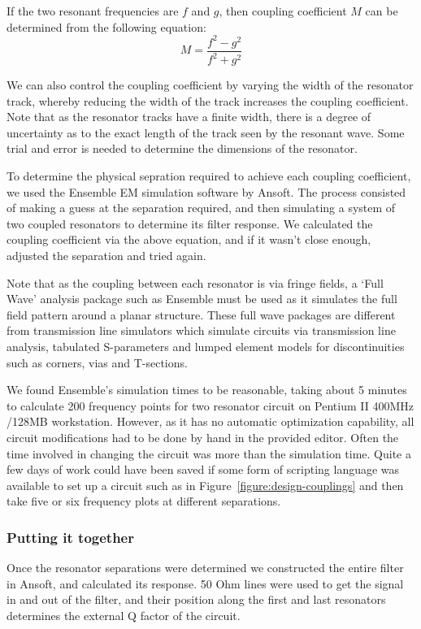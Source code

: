 If the two resonant frequencies are $f$ and $g$, then coupling coefficient $M$ can be determined from the following equation:
$$
M = 	\frac	{f^2 - g^2}
		{f^2 + g^2}
$$

We can also control the coupling coefficient by varying the width of the resonator track, whereby reducing the width of the track increases the coupling coefficient. Note that as the resonator tracks have a finite width, there is a degree of uncertainty as to the exact length of the track seen by the resonant wave. Some trial and error is needed to determine the dimensions of the resonator. 

To determine the physical sepration required to achieve each coupling coefficient, we used the Ensemble EM simulation software by Ansoft. The process consisted of making a guess at the separation required, and then simulating a system of two coupled resonators to determine its filter response. We calculated the coupling coefficient via the above equation, and if it wasn't close enough, adjusted the separation and tried again.

Note that as the coupling between each resonator is via fringe fields, a `Full Wave' analysis package such as Ensemble must be used as it simulates the full field pattern around a planar structure. These full wave packages are different from transmission line simulators which simulate circuits via transmission line analysis, tabulated S-parameters and lumped element models for discontinuities such as corners, vias and T-sections.

We found Ensemble's simulation times to be reasonable, taking about 5 minutes to calculate 200 frequency points for two resonator circuit on Pentium II 400MHz /128MB workstation. However, as it has no automatic optimization capability, all circuit modifications had to be done by hand in the provided editor. Often the time involved in changing the circuit was more than the simulation time. Quite a few days of work could have been saved if some form of scripting language was available to set up a circuit such as in Figure~\ref{figure:design-couplings} and then take five or six frequency plots at different separations.


\subsubsection{Putting it together}
Once the resonator separations were determined we constructed the entire filter in Ansoft, and calculated its response. 50 Ohm lines were used to get the signal in and out of the filter, and their position along the first and last resonators determines the external Q factor of the circuit.

